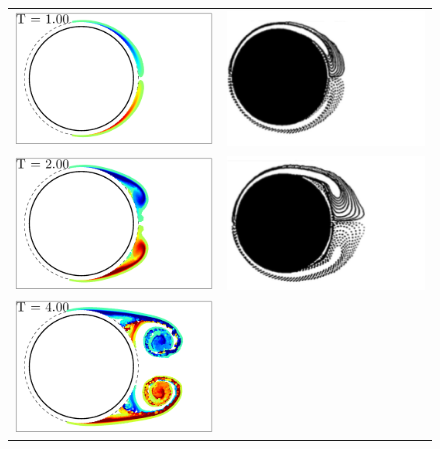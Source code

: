 \begin{figure}
 \begin{center}
 \begin{tabular}{cc}
 \includegraphics[width=6cm]{./Figures/vortices_T1_00.eps}  &
 \includegraphics[width=6cm]{./Figures/KOU_Re1000_T1.png}  \\
 \includegraphics[width=6cm]{./Figures/vortices_T2_00.eps}  &
 \includegraphics[width=6cm]{./Figures/KOU_Re1000_T2.png}  \\
 \includegraphics[width=6cm]{./Figures/vortices_T4_00.eps}  &

\end{tabular}
\end{center}
\end{figure}

